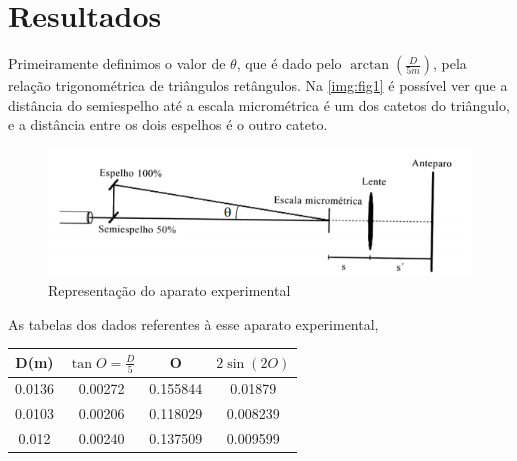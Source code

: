 \documentclass[
12pt,				%
openright,			%
oneside,			%
a4paper,			%
english,			%
french,				%
spanish,			%
brazil,				%
]{abntex2}
\begin{document}
\clearpage

\chapter{Resultados}

Primeiramente definimos o valor de $\theta$, que é dado pelo $\arctan{(\frac{D}{5m})}$, pela relação trigonométrica de triângulos retângulos. Na
\autoref{img:fig1} é possível ver que a distância do semiespelho até a escala
micrométrica é um dos catetos do triângulo, e a distância entre os dois espelhos
é o outro cateto.

\begin{figure}[!htb]
	\caption{\label{img:fig1} Representação do aparato experimental}
	\begin{center}
	  \includegraphics[scale=1]{./imagens/fig1.png}
	\end{center}
\end{figure}

As tabelas dos dados referentes à esse aparato experimental,
\begin{table}[htb]
  {%
    \begin{tabular}{cccc}
      \toprule
      D(m) & $\tan{O} = \frac{D}{5}$ & O & $2 \sin{(2 O)}$ \\
      \midrule \midrule
      0.0136 & 0.00272 & 0.155844 & 0.01879 \\
      \hline
      0.0103 & 0.00206 & 0.118029 & 0.008239 \\
      \hline
      0.012 & 0.00240 & 0.137509 & 0.009599 \\
      \bottomrule
    \end{tabular}%
  }
  {%
  }
\end{table}
\end{document}
